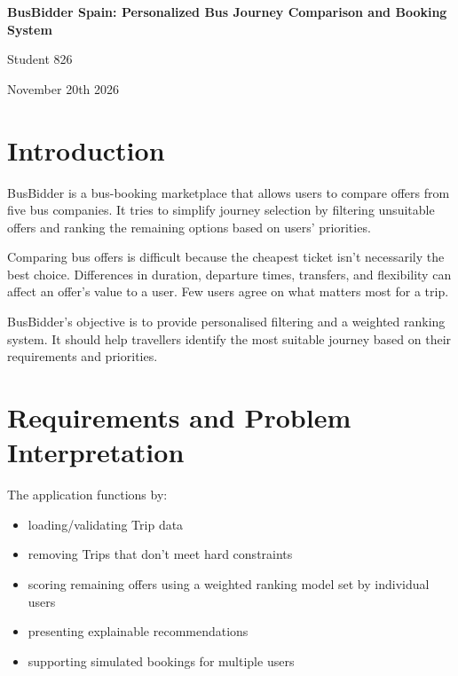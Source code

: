 ﻿\documentclass[11pt]{article}
\begin{document}
\begin{titlepage}
    \centering
    \vspace*{2cm}

    {\LARGE \textbf{BusBidder Spain: Personalized Bus Journey Comparison and Booking System}\par}
    \vspace{1.5cm}

    {\large Student 826\par}
    \vspace{0.5cm}

    {\large November 20th 2026\par}

    \vfill
\end{titlepage}

\tableofcontents
\newpage

\section{Introduction}
BusBidder is a bus-booking marketplace that allows users to compare offers
from five bus companies. It tries to simplify journey selection by
filtering unsuitable offers and ranking the remaining options based on users' priorities.

Comparing bus offers is difficult because the cheapest ticket isn't necessarily the best choice.
Differences in duration, departure times, transfers, and flexibility
can affect an offer's value to a user. Few users agree on what matters most for a trip.

BusBidder's objective is to provide personalised filtering and a weighted ranking system. It should help
travellers identify the most suitable journey based on their requirements and priorities.

\section{Requirements and Problem Interpretation}

The application functions by:
\begin{itemize}[nosep]
\item loading/validating Trip data
\item removing Trips that don't meet hard constraints
\item scoring remaining offers using a weighted ranking model set by individual users
\item presenting explainable recommendations
\item supporting simulated bookings for multiple users
\end{itemize}
\end{document}
